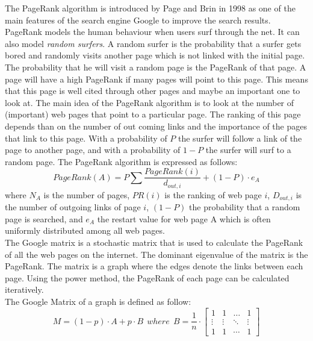 The PageRank algorithm is introduced by Page and Brin in 1998 as one of the main features of the search engine Google to improve the search results. PageRank models the human behaviour when users surf through the net. It can also model \textit{random surfers}. A random surfer is the probability that a surfer gets bored and randomly visits another page which is not linked with the initial page. The probability that he will visit a random page is the PageRank of that page. A page will have a high PageRank if many pages will point to this page. This means that this page is well cited through other pages and maybe an important one to look at.    The main idea of the PageRank algorithm is to look at the number of (important) web pages that point to a particular page. The ranking of this page depends than on the number of out coming links and the importance of the pages that link to this page. With a probability of $P$ the surfer will follow a link of the page to another page, and with a probability of $1-P$ the surfer will surf to a random page. The PageRank algorithm is expressed as follows:
\begin{equation}
PageRank(A)=P \sum \dfrac{PageRank(i)}{d_{out,i}} + (1-P) \cdot e_{A}
\end{equation}
where $N_{A}$ is the number of pages, $PR(i)$ is the ranking of web page $i$, $D_{out,i}$ is the number of outgoing links of page $i$, $(1-P)$ the probability that a random page is searched, and $e_{A}$ the restart value for web page A which is often uniformly distributed among all web pages. \\

The Google matrix is a stochastic matrix that is used to calculate the PageRank of all the web pages on the internet. The dominant eigenvalue of the matrix is the PageRank. The matrix is a graph where the edges denote the links between each page. Using the power method, the PageRank of each page can be calculated iteratively. \\

The Google Matrix of a graph is defined as follow:
\begin{equation}
M = (1-p) \cdot A + p \cdot B ~~where~~B=\dfrac{1}{n}\cdot \begin{bmatrix}
       1 & 1 & \ldots &1           \\[0.3em]
       \vdots & \vdots          & \ddots & \vdots \\[0.3em]
       1 & 1& \cdots &1
     \end{bmatrix}
\end{equation}

